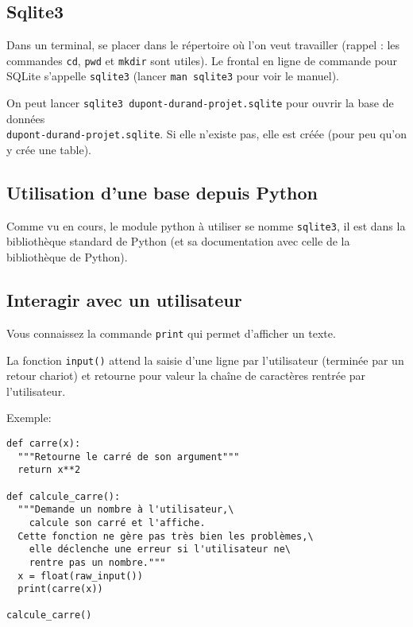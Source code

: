 \subsection{Sqlite3}

Dans un terminal, se placer dans le répertoire où l'on veut travailler
(rappel : les commandes \texttt{cd}, \texttt{pwd} et \texttt{mkdir}
sont utiles). Le frontal en ligne de commande pour SQLite s'appelle
\texttt{sqlite3} (lancer \texttt{man sqlite3} pour voir le manuel).

On peut lancer \texttt{sqlite3 dupont-durand-projet.sqlite} pour ouvrir la
base de données\\ \texttt{dupont-durand-projet.sqlite}. Si elle n'existe pas, elle est
créée (pour peu qu'on y crée une table).

\subsection{Utilisation d'une base depuis Python}

Comme vu en cours, le module python à utiliser se nomme
\texttt{sqlite3}, il est dans la bibliothèque standard de Python (et
sa documentation avec celle de la bibliothèque de Python).

\subsection{Interagir avec un utilisateur}

Vous connaissez la commande \texttt{print} qui permet d'afficher un
texte.

La fonction \texttt{input()} attend la saisie d'une ligne par
l'utilisateur (terminée par un retour chariot) et retourne pour valeur
la chaîne de caractères rentrée par l'utilisateur.

Exemple:
\begin{lstlisting}
def carre(x):
  """Retourne le carré de son argument"""
  return x**2

def calcule_carre():
  """Demande un nombre à l'utilisateur,\
    calcule son carré et l'affiche.
  Cette fonction ne gère pas très bien les problèmes,\
    elle déclenche une erreur si l'utilisateur ne\
    rentre pas un nombre."""
  x = float(raw_input())
  print(carre(x))

calcule_carre()
\end{lstlisting}

